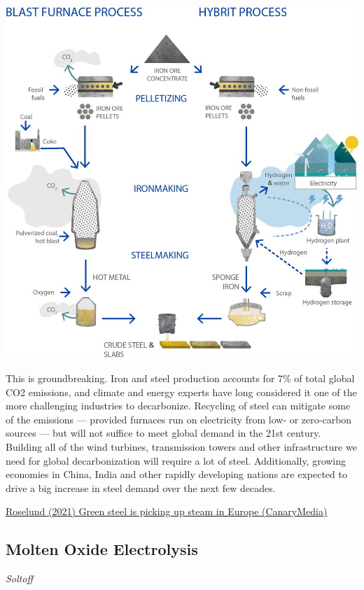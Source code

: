 \documentclass[
]{book}
\begin{document}
\includegraphics{fig/hybrit-h2-based-ironmaking-en.jpg}

This is groundbreaking. Iron and steel production accounts for 7\% of total global CO2 emissions, and climate and energy experts have long considered it one of the more challenging industries to decarbonize. Recycling of steel can mitigate some of the emissions --- provided furnaces run on electricity from low- or zero-carbon sources --- but will not suffice to meet global demand in the 21st century. Building all of the wind turbines, transmission towers and other infrastructure we need for global decarbonization will require a lot of steel. Additionally, growing economies in China, India and other rapidly developing nations are expected to drive a big increase in steel demand over the next few decades.

\href{https://www.canarymedia.com/articles/green-steel-is-coming-sooner-than-you-think/}{Roselund (2021) Green steel is picking up steam in Europe (CanaryMedia)}

\hypertarget{molten-oxide-electrolysis}{%
\subsection{Molten Oxide Electrolysis}\label{molten-oxide-electrolysis}}

\emph{Soltoff}
\end{document}
